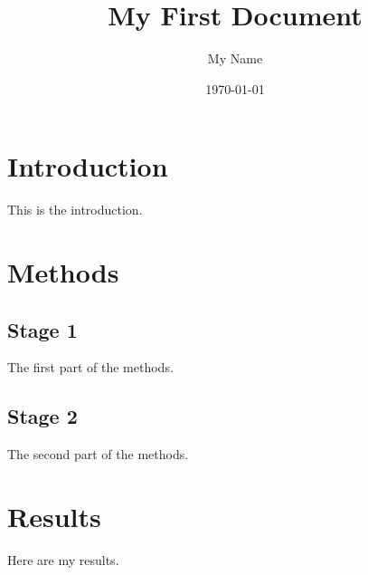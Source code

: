 \documentclass[a4paper, 12pt]{article}
\begin{document}
  \title{My First Document}
  \author{My Name}
  \date{\today}
  \maketitle
  \thispagestyle{empty}

  \section{Introduction}
  This is the introduction.

  \section{Methods}

  \subsection{Stage 1}
  The first part of the methods.

  \subsection{Stage 2}
  The second part of the methods.

  \section{Results}
  Here are my results.
\end{document}

